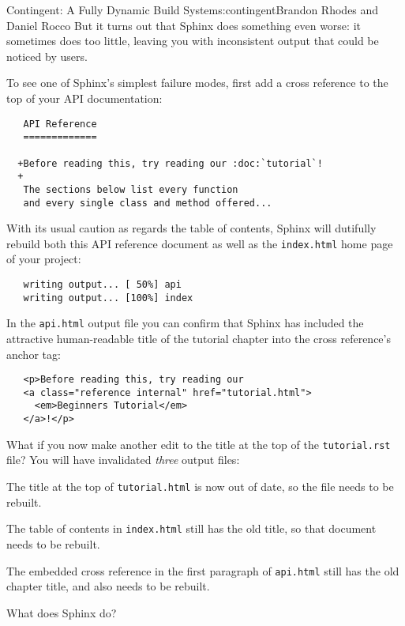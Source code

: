 \begin{aosachapter}{Contingent: A Fully Dynamic Build System}{s:contingent}{Brandon Rhodes and Daniel Rocco}
But it turns out that Sphinx does something even worse: it sometimes
does too little, leaving you with inconsistent output that could be
noticed by users.

To see one of Sphinx's simplest failure modes, first add a cross
reference to the top of your API documentation:

\begin{verbatim}
   API Reference
   =============

  +Before reading this, try reading our :doc:`tutorial`!
  +
   The sections below list every function
   and every single class and method offered...
\end{verbatim}

With its usual caution as regards the table of contents, Sphinx will
dutifully rebuild both this API reference document as well as the
\texttt{index.html} home page of your project:

\begin{verbatim}
   writing output... [ 50%] api
   writing output... [100%] index
\end{verbatim}

In the \texttt{api.html} output file you can confirm that Sphinx has
included the attractive human-readable title of the tutorial chapter
into the cross reference's anchor tag:

\begin{verbatim}
   <p>Before reading this, try reading our
   <a class="reference internal" href="tutorial.html">
     <em>Beginners Tutorial</em>
   </a>!</p>
\end{verbatim}

What if you now make another edit to the title at the top of the
\texttt{tutorial.rst} file? You will have invalidated \emph{three}
output files:

\begin{aosaenumerate}
\def\labelenumi{\arabic{enumi}.}
\item
  The title at the top of \texttt{tutorial.html} is now out of date, so
  the file needs to be rebuilt.
\item
  The table of contents in \texttt{index.html} still has the old title,
  so that document needs to be rebuilt.
\item
  The embedded cross reference in the first paragraph of
  \texttt{api.html} still has the old chapter title, and also needs to
  be rebuilt.
\end{aosaenumerate}

What does Sphinx do?


\end{aosachapter}
